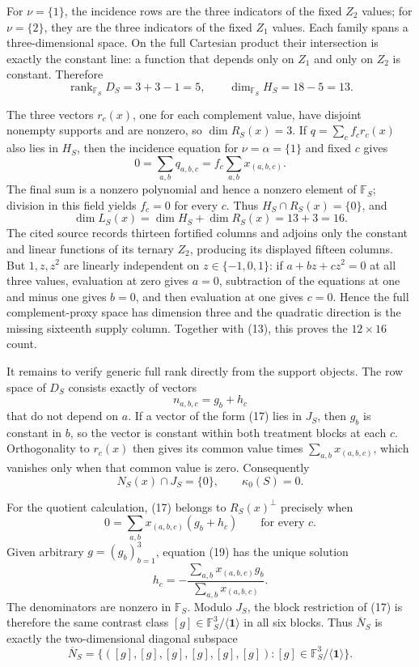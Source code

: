 For \(\nu=\{1\}\), the incidence rows are the three indicators of the fixed \(Z_2\) values; for \(\nu=\{2\}\), they are the three indicators of the fixed \(Z_1\) values.  Each family spans a three-dimensional space.  On the full Cartesian product their intersection is exactly the constant line: a function that depends only on \(Z_1\) and only on \(Z_2\) is constant.  Therefore
\[
\operatorname{rank}_{\mathbb F_S}D_S=3+3-1=5,
\qquad
\dim_{\mathbb F_S}H_S=18-5=13.
\tag{14}
\]

The three vectors \(r_c(x)\), one for each complement value, have disjoint nonempty supports and are nonzero, so \(\dim R_S(x)=3\).  If \(q=\sum_c f_c r_c(x)\) also lies in \(H_S\), then the incidence equation for \(\nu=\alpha=\{1\}\) and fixed \(c\) gives
\[
0=\sum_{a,b}q_{a,b,c}
=f_c\sum_{a,b}x_{(a,b,c)}.
\tag{15}
\]
The final sum is a nonzero polynomial and hence a nonzero element of \(\mathbb F_S\); division in this field yields \(f_c=0\) for every \(c\).  Thus \(H_S\cap R_S(x)=\{0\}\), and
\[
\dim L_S(x)=\dim H_S+\dim R_S(x)=13+3=16.
\tag{16}
\]
The cited source records thirteen fortified columns and adjoins only the constant and linear functions of its ternary \(Z_2\), producing its displayed fifteen columns.  But \(1,z,z^2\) are linearly independent on \(z\in\{-1,0,1\}\): if \(a+bz+cz^2=0\) at all three values, evaluation at zero gives \(a=0\), subtraction of the equations at one and minus one gives \(b=0\), and then evaluation at one gives \(c=0\).  Hence the full complement-proxy space has dimension three and the quadratic direction is the missing sixteenth supply column.  Together with (13), this proves the \(12\times16\) count.

It remains to verify generic full rank directly from the support objects.  The row space of \(D_S\) consists exactly of vectors
\[
n_{a,b,c}=g_b+h_c
\tag{17}
\]
that do not depend on \(a\).  If a vector of the form (17) lies in \(J_S\), then \(g_b\) is constant in \(b\), so the vector is constant within both treatment blocks at each \(c\).  Orthogonality to \(r_c(x)\) then gives its common value times \(\sum_{a,b}x_{(a,b,c)}\), which vanishes only when that common value is zero.  Consequently
\[
N_S(x)\cap J_S=\{0\},
\qquad
\kappa_0(S)=0.
\tag{18}
\]

For the quotient calculation, (17) belongs to \(R_S(x)^\perp\) precisely when
\[
0=\sum_{a,b}x_{(a,b,c)}(g_b+h_c)
\qquad\text{for every }c.
\tag{19}
\]
Given arbitrary \(g=(g_b)_{b=1}^3\), equation (19) has the unique solution
\[
h_c=-\frac{\sum_{a,b}x_{(a,b,c)}g_b}
{\sum_{a,b}x_{(a,b,c)}}.
\tag{20}
\]
The denominators are nonzero in \(\mathbb F_S\).  Modulo \(J_S\), the block restriction of (17) is therefore the same contrast class \([g]\in\mathbb F_S^3/\langle\mathbf1\rangle\) in all six blocks.  Thus \(\overline N_S\) is exactly the two-dimensional diagonal subspace
\[
\overline N_S
=\{([g],[g],[g],[g],[g],[g]):[g]\in\mathbb F_S^3/\langle\mathbf1\rangle\}.
\tag{21}
\]

